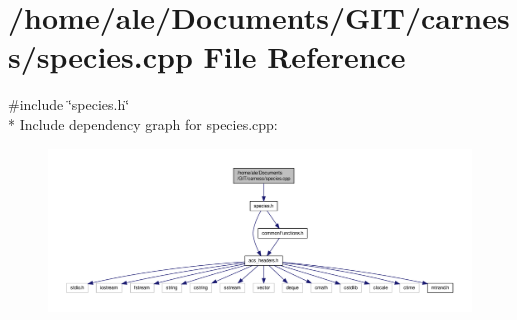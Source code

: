 \hypertarget{a00088}{\section{/home/ale/\-Documents/\-G\-I\-T/carness/species.cpp File Reference}
\label{a00088}
}
{\ttfamily \#include \char`\"{}species.\-h\char`\"{}}\\*
Include dependency graph for species.\-cpp\-:\nopagebreak
\begin{figure}[H]
\begin{center}
\leavevmode
\includegraphics[width=350pt]{a00138}
\end{center}
\end{figure}
